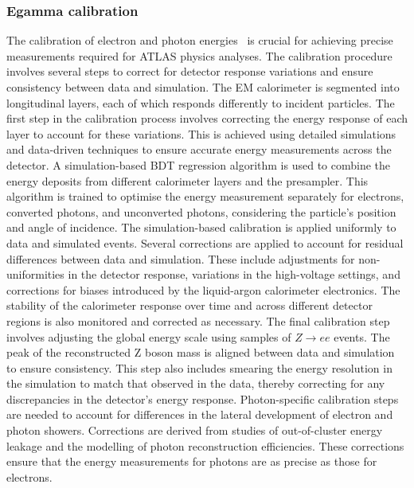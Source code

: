         \subsubsection{Egamma calibration}
            The calibration of electron and photon energies~\cite{EGAM-2021-02} is crucial for achieving precise measurements required for ATLAS physics analyses. 
            The calibration procedure involves several steps to correct for detector response variations and ensure consistency between data and simulation.
            The EM calorimeter is segmented into longitudinal layers, each of which responds differently to incident particles. The first step in the 
            calibration process involves correcting the energy response of each layer to account for these variations. This is achieved using detailed 
            simulations and data-driven techniques to ensure accurate energy measurements across the detector. A simulation-based BDT regression 
            algorithm is used to combine the energy deposits from different calorimeter layers and the presampler. This algorithm is trained to 
            optimise the energy measurement separately for electrons, converted photons, and unconverted photons, considering the particle's position 
            and angle of incidence. The simulation-based calibration is applied uniformly to data and simulated events. Several corrections are applied 
            to account for residual differences between data and simulation. These include adjustments for non-uniformities in the detector response, 
            variations in the high-voltage settings, and corrections for biases introduced by the liquid-argon calorimeter electronics. The stability 
            of the calorimeter response over time and across different detector regions is also monitored and corrected as necessary. The final calibration 
            step involves adjusting the global energy scale using samples of $Z \rightarrow ee$ events. The peak of the reconstructed Z boson mass is 
            aligned between data and simulation to ensure consistency. This step also includes smearing the energy resolution in the simulation to match 
            that observed in the data, thereby correcting for any discrepancies in the detector's energy response. Photon-specific calibration steps are 
            needed to account for differences in the lateral development of electron and photon showers. Corrections are derived from studies of out-of-cluster 
            energy leakage and the modelling of photon reconstruction efficiencies. These corrections ensure that the energy measurements for photons are 
            as precise as those for electrons.

